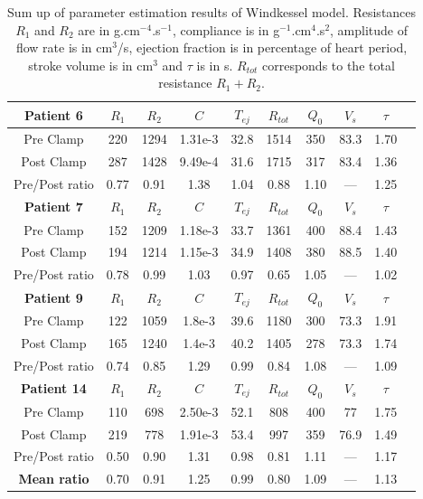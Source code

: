 \documentclass{config}
\begin{document}
\begin{table}[H]
\begin{center}
\begin{tabular}{|>{\columncolor[gray]{0.95} \color{black}} c|c|c|c|c|c|c|c|c|c|}
\hline
\rowcolor[gray]{0.85} \textbf{Patient 6}  & $R_1$ & $R_2$ & $C$ & $T_{ej}$ &  $R_{tot}$ & $Q_0$  & $V_s$ & $\tau$\\
\hline 
Pre Clamp  & 220 & 1294 & 1.31e-3 & 32.8 & 1514 & 350 & 83.3 & 1.70  \\ 
\hline 
Post Clamp  & 287 & 1428 & 9.49e-4 & 31.6 & 1715 & 317 & 83.4 & 1.36\\ 
\hline
Pre/Post ratio & 0.77 & 0.91 & 1.38 & 1.04 & 0.88 & 1.10 & --- & 1.25\\
\hline 
\hline
\rowcolor[gray]{0.85} \textbf{Patient 7}  & $R_1$ & $R_2$ & $C$ & $T_{ej}$ &  $R_{tot}$ & $Q_0$  & $V_s$ & $\tau$\\
\hline 
Pre Clamp & 152 & 1209 & 1.18e-3 & 33.7 & 1361 & 400 & 88.4 & 1.43 \\ 
\hline 
Post Clamp  & 194 & 1214 & 1.15e-3 & 34.9 & 1408 & 380 & 88.5 & 1.40 \\ 
\hline
Pre/Post ratio & 0.78 & 0.99 & 1.03 & 0.97& 0.65 & 1.05 &  --- & 1.02  \\
\hline
\hline
\rowcolor[gray]{0.85} \textbf{Patient 9} & $R_1$ & $R_2$ & $C$ & $T_{ej}$ &  $R_{tot}$ & $Q_0$  & $V_s$ & $\tau$\\
\hline 
Pre Clamp & 122 & 1059 & 1.8e-3 & 39.6  & 1180 & 300 & 73.3 & 1.91 \\ 
\hline 
Post Clamp &  165 & 1240 & 1.4e-3 & 40.2 & 1405 & 278 & 73.3 & 1.74  \\ 
\hline
Pre/Post ratio & 0.74 & 0.85 & 1.29 & 0.99 & 0.84 & 1.08 & --- & 1.09  \\
\hline
\hline
\rowcolor[gray]{0.85} \textbf{Patient 14}  & $R_1$ & $R_2$ & $C$ & $T_{ej}$ &  $R_{tot}$ & $Q_0$  & $V_s$ & $\tau$ \\
\hline 
Pre Clamp & 110 & 698 & 2.50e-3 & 52.1 & 808 & 400 & 77 & 1.75   \\ 
\hline 
Post Clamp  & 219 & 778 & 1.91e-3 & 53.4 & 997 & 359 & 76.9 & 1.49 \\ 
\hline
Pre/Post ratio & 0.50 & 0.90 & 1.31 & 0.98 & 0.81 & 1.11 & --- & 1.17 \\
\hline 
\hline 
\textbf{Mean ratio} & 0.70 & 0.91 & 1.25 & 0.99 & 0.80 &  1.09 & --- & 1.13 \\
\hline 
\end{tabular}
\caption{Sum up of parameter estimation results of Windkessel model. Resistances $R_1$ and $R_2$ are in g.cm$^{-4}$.s$^{-1}$, compliance is in g$^{-1}$.cm$^4$.s$^{2}$, amplitude of flow rate is in cm$^3$/s, ejection fraction is in percentage of heart period, stroke volume is in cm$^3$ and $\tau$ is in s. $R_{tot}$ corresponds to the total resistance $R_1 + R_2$. }
\label{param_est_tab}
\end{center}
\end{table}
\end{document}
